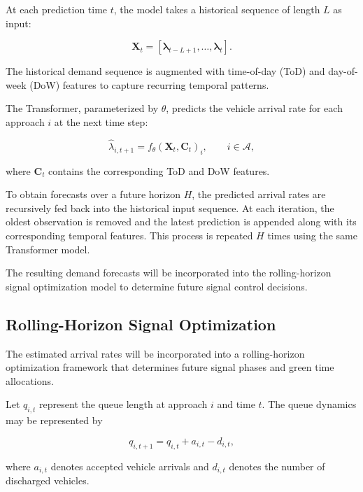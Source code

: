 \documentclass[letterpaper,12pt,conference]{ieeeconf}
\begin{document}
At each prediction time $t$, the model takes a historical
sequence of length $L$ as input:

\begin{equation}
\mathbf{X}_t =
[
\boldsymbol{\lambda}_{t-L+1},
\ldots,
\boldsymbol{\lambda}_t
].
\end{equation}

The historical demand sequence is augmented with
time-of-day (ToD) and day-of-week (DoW) features
to capture recurring temporal patterns.

The Transformer, parameterized by $\theta$, predicts
the vehicle arrival rate for each approach $i$
at the next time step:

\begin{equation}
\hat{\lambda}_{i,t+1}
=
f_{\theta}(\mathbf{X}_t,\mathbf{C}_t)_i,
\qquad i \in \mathcal{A},
\end{equation}

where $\mathbf{C}_t$ contains the corresponding
ToD and DoW features.

To obtain forecasts over a future horizon $H$,
the predicted arrival rates are recursively fed
back into the historical input sequence.
At each iteration, the oldest observation is removed
and the latest prediction is appended along with
its corresponding temporal features.
This process is repeated $H$ times using the
same Transformer model.


The resulting demand forecasts will be incorporated
into the rolling-horizon signal optimization model
to determine future signal control decisions.





\subsection{Rolling-Horizon Signal Optimization}

The estimated arrival rates will be incorporated into a
rolling-horizon optimization framework that determines
future signal phases and green time allocations.

Let $q_{i,t}$ represent the queue length at approach $i$
and time $t$. The queue dynamics may be represented by

\begin{equation}
q_{i,t+1}
=
q_{i,t}
+
a_{i,t}
-
d_{i,t},
\end{equation}

where $a_{i,t}$ denotes accepted vehicle arrivals and
$d_{i,t}$ denotes the number of discharged vehicles.
\end{document}
